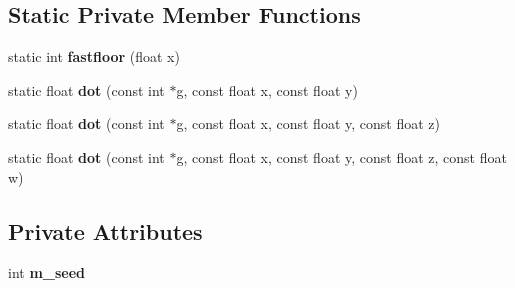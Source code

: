 \subsection*{Static Private Member Functions}
\begin{DoxyCompactItemize}
\item 
\mbox{\label{classflounder_1_1noisesimplex_a18ed79288897387ffbdbd6548b448cb0}} 
static int {\bfseries fastfloor} (float x)
\item 
\mbox{\label{classflounder_1_1noisesimplex_ac3a43a9e690d0d93b81471837c49feed}} 
static float {\bfseries dot} (const int $\ast$g, const float x, const float y)
\item 
\mbox{\label{classflounder_1_1noisesimplex_a174740811c405c685de9a109cc3f63f6}} 
static float {\bfseries dot} (const int $\ast$g, const float x, const float y, const float z)
\item 
\mbox{\label{classflounder_1_1noisesimplex_ad815144ff451cfaea2b1437847fa8e0e}} 
static float {\bfseries dot} (const int $\ast$g, const float x, const float y, const float z, const float w)
\end{DoxyCompactItemize}
\subsection*{Private Attributes}
\begin{DoxyCompactItemize}
\item 
\mbox{\label{classflounder_1_1noisesimplex_a45c84283b989ece9e7d4d42f0567270b}} 
int {\bfseries m\+\_\+seed}
\end{DoxyCompactItemize}
